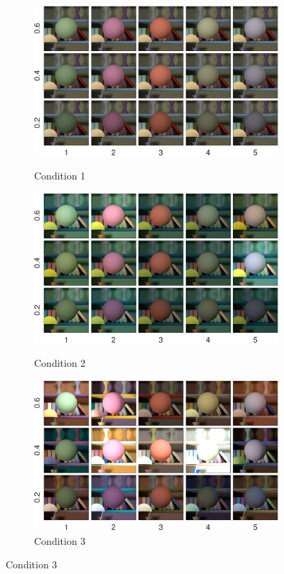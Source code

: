 \documentclass{jov}
\begin{document}
\begin{figure}
\centering
	\begin{subfigure}[b]{0.33 \textwidth}
		\caption{Condition 1}
		\includegraphics[width=\textwidth]{../FiguresDraft5/Figure1/Figure1_b.pdf}
 		\label{fig:backgroundVarying}
	\end{subfigure}
	\begin{subfigure}[b]{0.33 \textwidth}
        \caption{Condition 2}	
        \includegraphics[width=\textwidth]{../FiguresDraft5/Figure5/Figure5_b.pdf}
        \label{fig:targetIlluminantVarying}
    \end{subfigure}
	\begin{subfigure}[b]{0.33 \textwidth}
	\caption{Condition 3}	
        \includegraphics[width=\textwidth]{../FiguresDraft5/Figure5/Figure5_c.pdf}        

\end{subfigure}
\end{figure}
\end{document}
